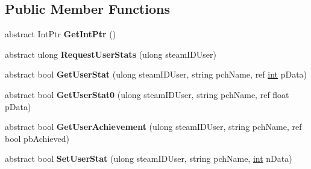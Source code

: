 \subsection*{Public Member Functions}
\begin{DoxyCompactItemize}
\item 
\hypertarget{classValve_1_1Steamworks_1_1ISteamGameServerStats_a4cbb9c913f56e8449c59e80dcb090d2b}{}abstract Int\+Ptr {\bfseries Get\+Int\+Ptr} ()\label{classValve_1_1Steamworks_1_1ISteamGameServerStats_a4cbb9c913f56e8449c59e80dcb090d2b}

\item 
\hypertarget{classValve_1_1Steamworks_1_1ISteamGameServerStats_a89921e659af3879f57e07a63cdc0f2c3}{}abstract ulong {\bfseries Request\+User\+Stats} (ulong steam\+I\+D\+User)\label{classValve_1_1Steamworks_1_1ISteamGameServerStats_a89921e659af3879f57e07a63cdc0f2c3}

\item 
\hypertarget{classValve_1_1Steamworks_1_1ISteamGameServerStats_a33c5368b148ec94290baf050aa26442d}{}abstract bool {\bfseries Get\+User\+Stat} (ulong steam\+I\+D\+User, string pch\+Name, ref \hyperlink{SDL__thread_8h_a6a64f9be4433e4de6e2f2f548cf3c08e}{int} p\+Data)\label{classValve_1_1Steamworks_1_1ISteamGameServerStats_a33c5368b148ec94290baf050aa26442d}

\item 
\hypertarget{classValve_1_1Steamworks_1_1ISteamGameServerStats_ae33932aa031968860d0c4df2be4b0278}{}abstract bool {\bfseries Get\+User\+Stat0} (ulong steam\+I\+D\+User, string pch\+Name, ref float p\+Data)\label{classValve_1_1Steamworks_1_1ISteamGameServerStats_ae33932aa031968860d0c4df2be4b0278}

\item 
\hypertarget{classValve_1_1Steamworks_1_1ISteamGameServerStats_adc8b50182577f70cd1a47408986666f9}{}abstract bool {\bfseries Get\+User\+Achievement} (ulong steam\+I\+D\+User, string pch\+Name, ref bool pb\+Achieved)\label{classValve_1_1Steamworks_1_1ISteamGameServerStats_adc8b50182577f70cd1a47408986666f9}

\item 
\hypertarget{classValve_1_1Steamworks_1_1ISteamGameServerStats_ab5386ea9b99f853a05378de8ca688782}{}abstract bool {\bfseries Set\+User\+Stat} (ulong steam\+I\+D\+User, string pch\+Name, \hyperlink{SDL__thread_8h_a6a64f9be4433e4de6e2f2f548cf3c08e}{int} n\+Data)\label{classValve_1_1Steamworks_1_1ISteamGameServerStats_ab5386ea9b99f853a05378de8ca688782}


\end{DoxyCompactItemize}
